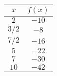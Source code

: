 \begin{tabular}{cc} \toprule
$x$     & $f(x)$ \\\midrule
$2$     & $-10$  \\
$3 / 2$ & $-8$   \\
$7 / 2$ & $-16$  \\
$5$     & $-22$  \\
$7$     & $-30$  \\
$10$    & $-42$  \\\bottomrule
\end{tabular}
